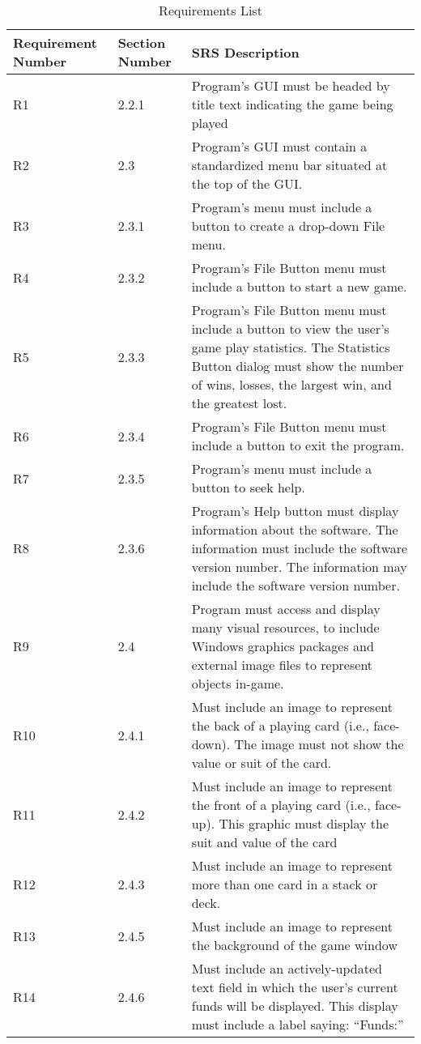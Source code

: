 \documentclass [landscape, 8pt] {article}
\begin{document}
	\begin {table}[]
		\caption {Requirements List}
		\centering
		\begin {tabular}{p{4cm}p{3cm}p{15cm}}
			\hline\hline
			Requirement Number & Section Number & SRS Description \\[0.5ex]
			\hline
		
			R1 & 2.2.1 & Program's GUI must be headed by title text indicating the game being played\\
			R2 & 2.3 & Program's GUI must contain a standardized menu bar situated at the top of the GUI. \\
			R3 & 2.3.1 & Program's menu must include a button to create a drop-down File menu.\\
			R4 & 2.3.2 & Program's File Button menu must include a button to start a new game.\\
			R5 & 2.3.3 & Program's File Button menu must include a button to view the user's game play statistics. The Statistics Button dialog must show the number of wins, losses, the largest win, and the greatest lost.\\
			R6 & 2.3.4 & Program's File Button menu must include a button to exit the program.\\
			R7 & 2.3.5 & Program's menu must include a button to seek help.\\
			R8 & 2.3.6 & Program's Help button must display information about the software. The information must include the software version number. The information may include the software version number.\\
			R9 & 2.4 & Program must access and display many visual resources, to include Windows graphics packages and external image files to represent objects in-game.\\
			R10 & 2.4.1 & Must include an image to represent the back of a playing card (i.e., face-down). The image must not show the value or suit of the card. \\
			R11 & 2.4.2 & Must include an image to represent the front of a playing card (i.e., face-up). This graphic must display the suit and value of the card \\
			R12 & 2.4.3 & Must include an image to represent more than one card in a stack or deck. \\
			R13 & 2.4.5 & Must include an image to represent the background of the game window\\
			R14 & 2.4.6 & Must include an actively-updated text field in which the user's current funds will be displayed. This display must include a label saying: “Funds:”\\

\end{tabular}
\end{table}
\end{document}
